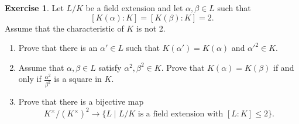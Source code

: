 \documentclass[a4paper,10pt,reqno]{amsart}
\theoremstyle{definition} %
\newtheorem{ex}{Exercise}[section]
\begin{document}
\begin{ex}
    Let $L/K$ be a field extension and let $\alpha, \beta\in L$ such that 
    \[
    [K(\alpha):K]=[K(\beta):K]=2.
    \]
    Assume that the characteristic of $K$ is not 2.
    \begin{enumerate}[label=(\roman*)]
    \item Prove that there is an $\alpha' \in L$ such that $K(\alpha') = K(\alpha)$ and $\alpha'^2 \in K$.
    \item Assume that $\alpha,\beta \in L$ satisfy $\alpha^2,\beta^2 \in K$. Prove that $K(\alpha)=K(\beta)$ if and only if $\frac{\alpha^2}{\beta^2}$ is a square in $K$.
    \item Prove that there is a bijective map 
    \[
    K^\times/(K^\times)^2\longrightarrow \{L\mid L/K \text{ is a field extension with } [L:K] \leq 2\}.
    \]
\end{enumerate}    
\end{ex}
\end{document}

